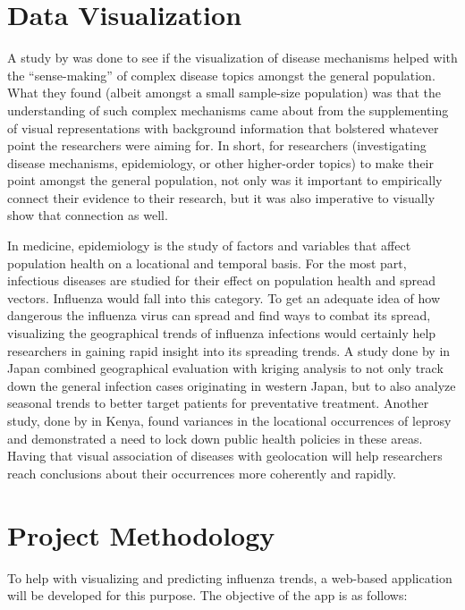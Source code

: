 \documentclass[12pt]{article}
\begin{document}
\section{Data Visualization}

A study by \cite{bmc} was done to see if the visualization of disease mechanisms helped with the “sense-making” of complex disease topics amongst the general population. What they found (albeit amongst a small sample-size population) was that the understanding of such complex mechanisms came about from the supplementing of visual representations with background information that bolstered whatever point the researchers were aiming for. In short, for researchers (investigating disease mechanisms, epidemiology, or other higher-order topics) to make their point amongst the general population, not only was it important to empirically connect their evidence to their research, but it was also imperative to visually show that connection as well.

In medicine, epidemiology is the study of factors and variables that affect population health on a locational and temporal basis. For the most part, infectious diseases are studied for their effect on population health and spread vectors. Influenza would fall into this category. To get an adequate idea of how dangerous the influenza virus can spread and find ways to combat its spread, visualizing the geographical trends of influenza infections would certainly help researchers in gaining rapid insight into its spreading trends. A study done by \cite{emerging} in Japan combined geographical evaluation with kriging analysis to not only track down the general infection cases originating in western Japan, but to also analyze seasonal trends to better target patients for preventative treatment. Another study, done by \cite{plos-ntd} in Kenya, found variances in the locational occurrences of leprosy and demonstrated a need to lock down public health policies in these areas. Having that visual association of diseases with geolocation will help researchers reach conclusions about their occurrences more coherently and rapidly.

\section{Project Methodology}

To help with visualizing and predicting influenza trends, a web-based application will be developed for this purpose. The objective of the app is as follows:
\end{document}

